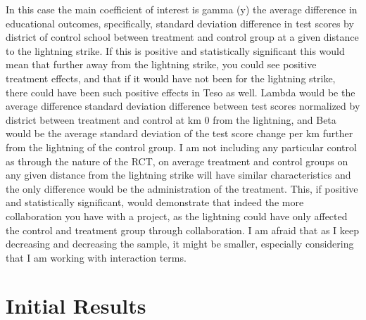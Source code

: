 \documentclass{article}
\begin{document}
In this case the main coefficient of interest is gamma (y) the average difference in educational outcomes, specifically, standard deviation difference in test scores by district of control school between treatment and control group at a given distance to the lightning strike. If this is positive and statistically significant this would mean that further away from the lightning strike, you could see positive treatment effects, and that if it would have not been for the lightning strike, there could have been such positive effects in Teso as well. Lambda would be the average difference standard deviation difference between test scores normalized by district between treatment and control at km 0 from the lightning, and Beta would be the average standard deviation of the test score change per km further from the lightning of the control group. I am not including any particular control as through the nature of the RCT, on average treatment and control groups on any given distance from the lightning strike will have similar characteristics and the only difference would be the administration of the treatment. This, if positive and statistically significant, would demonstrate that indeed the more collaboration you have with a project, as the lightning could have only affected the control and treatment group through collaboration. I am afraid that as I keep decreasing and decreasing the sample, it might be smaller, especially considering that I am working with interaction terms. 

\section{Initial Results}




\printbibliography
\end{document}

